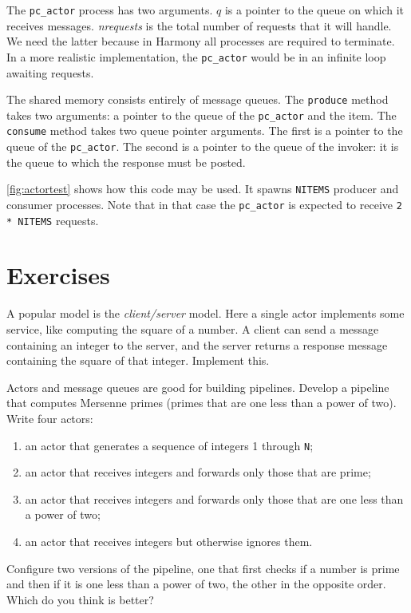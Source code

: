 \documentclass{report}
\begin{document}
The \texttt{pc\_actor} process has two arguments.  $q$ is a pointer
to the queue on which it receives messages.  \textit{nrequests} is the total
number of requests that it will handle.  We need the latter because in Harmony
all processes are required to terminate.  In a more realistic implementation,
the \texttt{pc\_actor} would be in an infinite loop awaiting requests.

The shared memory consists entirely of message queues.
The \texttt{produce} method takes two arguments: a pointer to the queue
of the \texttt{pc\_actor} and the item.  The \texttt{consume} method
takes two queue pointer arguments.  The first is a pointer to the queue
of the \texttt{pc\_actor}.  The second is a pointer to the queue of the
invoker: it is the queue to which the response must be posted.

\autoref{fig:actortest} shows how this code may be used.  It spawns
\texttt{NITEMS} producer and consumer processes.  Note that in that
case the \texttt{pc\_actor} is expected to receive \texttt{2 * NITEMS}
requests.

\section*{Exercises}
\begin{problems}
\item \label{ex:cltsvr} A popular model is the \emph{client/server} model.
Here a single actor implements some service, like computing the square of a
number.
A client can send a message containing an integer to the server, and the
server returns a response message containing the square of that integer.
Implement this.
\item Actors and message queues are good for building pipelines.
Develop a pipeline that computes Mersenne primes (primes that are one less
than a power of two).  Write four actors:
\begin{enumerate}
\item an actor that generates a sequence of integers 1 through \texttt{N};
\item an actor that receives integers and forwards only those that are prime;
\item an actor that receives integers and forwards only those that are one
less than a power of two;
\item an actor that receives integers but otherwise ignores them.
\end{enumerate}
Configure two versions of the pipeline, one that first checks if a number
is prime and then if it is one less than a power of two, the other
in the opposite order.  Which do you think is better?
\end{problems}
\end{document}
